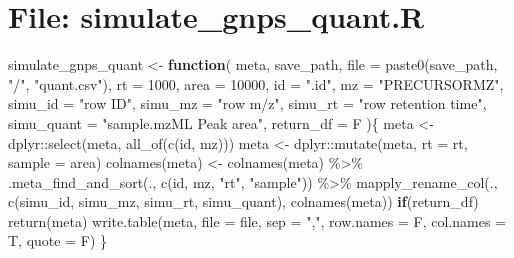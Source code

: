 \documentclass[
]{article}
\newenvironment{Shaded}{\begin{snugshade}}{\end{snugshade}}
\newcommand{\AttributeTok}[1]{\textcolor[rgb]{0.77,0.63,0.00}{#1}}
\newcommand{\ControlFlowTok}[1]{\textcolor[rgb]{0.13,0.29,0.53}{\textbf{#1}}}
\newcommand{\DecValTok}[1]{\textcolor[rgb]{0.00,0.00,0.81}{#1}}
\newcommand{\FunctionTok}[1]{\textcolor[rgb]{0.00,0.00,0.00}{#1}}
\newcommand{\NormalTok}[1]{#1}
\newcommand{\OtherTok}[1]{\textcolor[rgb]{0.56,0.35,0.01}{#1}}
\newcommand{\SpecialCharTok}[1]{\textcolor[rgb]{0.00,0.00,0.00}{#1}}
\newcommand{\StringTok}[1]{\textcolor[rgb]{0.31,0.60,0.02}{#1}}
\begin{document}
\hypertarget{file-simulate_gnps_quant.r}{%
\section{File: simulate\_gnps\_quant.R}\label{file-simulate_gnps_quant.r}}

\begin{Shaded}
\begin{Highlighting}[]
\NormalTok{simulate\_gnps\_quant }\OtherTok{\textless{}{-}} 
  \ControlFlowTok{function}\NormalTok{(}
\NormalTok{           meta,}
\NormalTok{           save\_path,}
           \AttributeTok{file =} \FunctionTok{paste0}\NormalTok{(save\_path, }\StringTok{"/"}\NormalTok{, }\StringTok{"quant.csv"}\NormalTok{),}
           \AttributeTok{rt =} \DecValTok{1000}\NormalTok{,}
           \AttributeTok{area =} \DecValTok{10000}\NormalTok{,}
           \AttributeTok{id =} \StringTok{".id"}\NormalTok{,}
           \AttributeTok{mz =} \StringTok{"PRECURSORMZ"}\NormalTok{,}
           \AttributeTok{simu\_id =} \StringTok{"row ID"}\NormalTok{,}
           \AttributeTok{simu\_mz =} \StringTok{"row m/z"}\NormalTok{,}
           \AttributeTok{simu\_rt =} \StringTok{"row retention time"}\NormalTok{,}
           \AttributeTok{simu\_quant =} \StringTok{"sample.mzML Peak area"}\NormalTok{,}
           \AttributeTok{return\_df =}\NormalTok{ F}
\NormalTok{           )\{}
\NormalTok{    meta }\OtherTok{\textless{}{-}}\NormalTok{ dplyr}\SpecialCharTok{::}\FunctionTok{select}\NormalTok{(meta, }\FunctionTok{all\_of}\NormalTok{(}\FunctionTok{c}\NormalTok{(id, mz)))}
\NormalTok{    meta }\OtherTok{\textless{}{-}}\NormalTok{ dplyr}\SpecialCharTok{::}\FunctionTok{mutate}\NormalTok{(meta, }\AttributeTok{rt =}\NormalTok{ rt, }\AttributeTok{sample =}\NormalTok{ area)}
    \FunctionTok{colnames}\NormalTok{(meta) }\OtherTok{\textless{}{-}} \FunctionTok{colnames}\NormalTok{(meta) }\SpecialCharTok{\%\textgreater{}\%} 
      \FunctionTok{.meta\_find\_and\_sort}\NormalTok{(., }\FunctionTok{c}\NormalTok{(id, mz, }\StringTok{"rt"}\NormalTok{, }\StringTok{"sample"}\NormalTok{)) }\SpecialCharTok{\%\textgreater{}\%} 
      \FunctionTok{mapply\_rename\_col}\NormalTok{(., }\FunctionTok{c}\NormalTok{(simu\_id, simu\_mz, simu\_rt, simu\_quant),}
                        \FunctionTok{colnames}\NormalTok{(meta))}
    \ControlFlowTok{if}\NormalTok{(return\_df)}
      \FunctionTok{return}\NormalTok{(meta)}
    \FunctionTok{write.table}\NormalTok{(meta, }\AttributeTok{file =}\NormalTok{ file, }\AttributeTok{sep =} \StringTok{","}\NormalTok{, }\AttributeTok{row.names =}\NormalTok{ F, }\AttributeTok{col.names =}\NormalTok{ T, }\AttributeTok{quote =}\NormalTok{ F)}
\NormalTok{  \}}
\end{Highlighting}
\end{Shaded}
\end{document}

